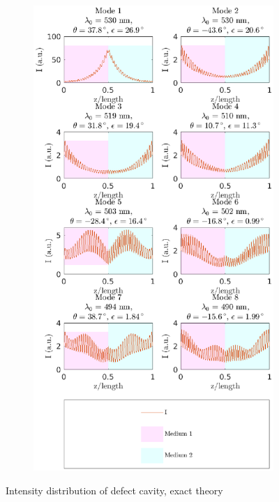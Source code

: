 \begin{figure}
\begin{subfigure}{\linewidth}
		\includegraphics[width=\linewidth]{plots/defect/intensity_distribution_oseen}
		\caption{}
	\end{subfigure}
	\caption[Intensity distribution of defect cavity, exact theory]{Intensity distribution of defect cavity, exact theory}
	\label{fig:defect_intensity_appendix}
\end{figure}


